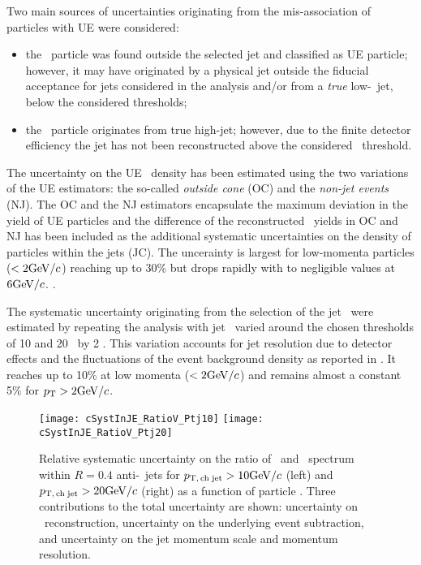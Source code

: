 
Two main sources of uncertainties originating from the mis-association of \Vzero particles with UE were considered:
\begin{itemize}
\item the \Vzero\ particle was found outside the selected jet and classified as UE particle; however, it may have originated by a physical jet outside the fiducial acceptance for jets considered in the analysis and/or from a {\it true} low-\pt\ jet, below the considered thresholds;
\item the \Vzero\ particle originates from true high-\pt jet; however, due to the finite detector efficiency the jet has not been reconstructed above the considered \pt\ threshold.
\end{itemize}

The uncertainty on the UE \Vzero\ density has been estimated using the two variations of the UE estimators: the so-called {\it outside cone} (OC) and the {\it non-jet events} (NJ).
The OC and the NJ estimators encapsulate the maximum deviation in the yield of UE particles and the difference of the reconstructed \Vzero\ yields in OC and NJ has been included as the additional systematic uncertainties on the density of particles within the jets (JC). 
The uncerainty is largest for low-momenta particles ($< 2 \mathrm{GeV}/c$) reaching up to 30\% but drops rapidly with \pt to negligible values at $6 \mathrm{GeV}/c$. .



The systematic uncertainty originating from the selection of the jet \pt\ were estimated by repeating the analysis with jet \pt\ varied around the chosen thresholds of 10 and 20 \gevc\ by 2 \gevc. 
This variation accounts for jet resolution due to detector effects and the fluctuations of the event background density as reported in \cite{Adam:2015hoa}. 
It reaches up to 10\% at low momenta ($<2\mathrm{GeV}/c$) and remains almost a constant 5\% for $p_{\mathrm{T}} > 2 \mathrm{GeV}/c$. 

\begin{figure}[htbp]
	\centering
	\texttt{[image: cSystInJE\_RatioV\_Ptj10]}
	\texttt{[image: cSystInJE\_RatioV\_Ptj20]}
	\caption{Relative systematic uncertainty on the ratio of \lda\  and \ks\ spectrum within $R=0.4$ anti-\kt\ jets for $p_\mathrm{T,\,ch\;jet}>10\mathrm{GeV}/c$ (left) and $p_\mathrm{T,\,ch\;jet}>20\mathrm{GeV}/c$ (right) as a function of particle \pt. Three contributions to the total uncertainty are shown: uncertainty on \vzero\ reconstruction, uncertainty on the underlying event subtraction, and uncertainty on the jet momentum scale and momentum resolution. }
	\label{fig:systUncertRatio}
\end{figure}

